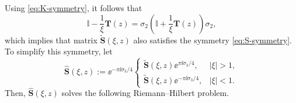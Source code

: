 Using \eqref{eq:K-symmetry}, it follows that
\[
\mathbb I - \dfrac{1}{\xi}\mathbf T(z) = \sigma_2\left( \mathbb I + \dfrac{1}{\xi}\mathbf T(z) \right) \sigma_2,
\]
which implies that matrix $\widetilde{\mathbf{S}}(\xi, z)$ also satisfies the symmetry \eqref{eq:S-symmetry}. To simplify this symmetry, let
\begin{equation}
\widehat{\mathbf{S}}(\xi, z) := \ee^{-\pi \ii \sigma_3/4 } \begin{cases} \widetilde{\mathbf{S}}(\xi, z) \ee^{\pi \ii \sigma_3/4}, & |\xi| >1, \\
\widetilde{\mathbf{S}}(\xi, z) \ee^{-\pi \ii \sigma_3/4}, & |\xi| <1.
\end{cases}
 \label{eq:rotation-transformation}
\end{equation}
Then, $\widehat{\mathbf{S}}(\xi, z)$ solves the following Riemann--Hilbert problem.
